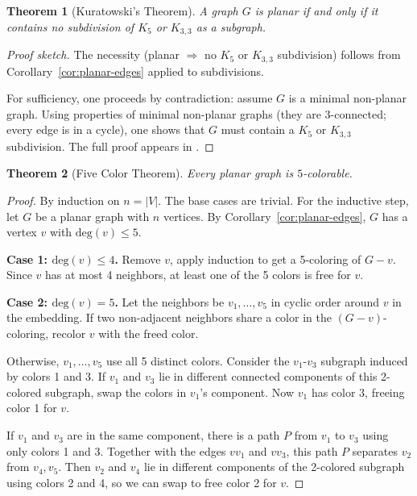 \documentclass[12pt,a4paper]{amsart}
\newtheorem{theorem}{Theorem}[section]
\theoremstyle{definition}
\theoremstyle{remark}
\newcommand{\degv}{\mathrm{deg}}
\begin{document}
\begin{theorem}[Kuratowski's Theorem]
\label{thm:kuratowski}
A graph $G$ is planar if and only if it contains no subdivision of $K_5$ or
$K_{3,3}$ as a subgraph.
\end{theorem}

\begin{proof}[Proof sketch]
The necessity (planar $\Rightarrow$ no $K_5$ or $K_{3,3}$ subdivision) follows
from Corollary~\ref{cor:planar-edges} applied to subdivisions.

For sufficiency, one proceeds by contradiction: assume $G$ is a minimal
non-planar graph. Using properties of minimal non-planar graphs (they are
3-connected; every edge is in a cycle), one shows that $G$ must contain a
$K_5$ or $K_{3,3}$ subdivision. The full proof appears in \cite{diestel2017}.
\end{proof}

\begin{theorem}[Five Color Theorem]
\label{thm:5color}
Every planar graph is $5$-colorable.
\end{theorem}

\begin{proof}
By induction on $n = |V|$. The base cases are trivial. For the inductive step,
let $G$ be a planar graph with $n$ vertices. By Corollary~\ref{cor:planar-edges},
$G$ has a vertex $v$ with $\degv(v) \le 5$.

\textbf{Case 1: $\degv(v) \le 4$.} Remove $v$, apply induction to get a
5-coloring of $G - v$. Since $v$ has at most 4 neighbors, at least one of the
5 colors is free for $v$.

\textbf{Case 2: $\degv(v) = 5$.} Let the neighbors be $v_1, \ldots, v_5$ in
cyclic order around $v$ in the embedding. If two non-adjacent neighbors share
a color in the $(G-v)$-coloring, recolor $v$ with the freed color.

Otherwise, $v_1, \ldots, v_5$ use all 5 distinct colors. Consider the
$v_1$-$v_3$ subgraph induced by colors 1 and 3. If $v_1$ and $v_3$ lie in
different connected components of this 2-colored subgraph, swap the colors in
$v_1$'s component. Now $v_1$ has color 3, freeing color 1 for $v$.

If $v_1$ and $v_3$ are in the same component, there is a path $P$ from $v_1$
to $v_3$ using only colors 1 and 3. Together with the edges $v v_1$ and $v v_3$,
this path $P$ separates $v_2$ from $v_4, v_5$. Then $v_2$ and $v_4$ lie in
different components of the 2-colored subgraph using colors 2 and 4, so we
can swap to free color 2 for $v$.
\end{proof}
\end{document}

